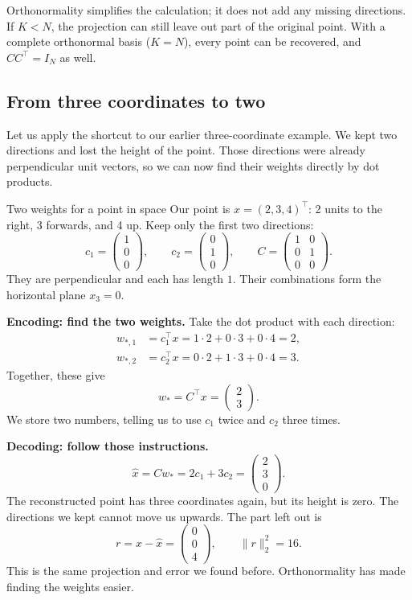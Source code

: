 \documentclass[a4paper,12pt,oneside]{report}
\begin{document}
Orthonormality simplifies the calculation; it does not add any
missing directions. If $K<N$, the projection can still leave out
part of the original point. With a complete orthonormal basis
($K=N$), every point can be recovered, and $CC^\top=I_N$ as well.

\subsection{From three coordinates to two}

Let us apply the shortcut to our earlier three-coordinate example.
We kept two directions and lost the height of the point. Those directions were already perpendicular unit vectors,
so we can now find their weights directly by dot products.

\begin{framedexample}{Two weights for a point in space}
Our point is $x=(2,3,4)^\top$: 2 units to the right, 3 forwards,
and 4 up. Keep only the first two directions:
\[
  c_1=\begin{pmatrix}1\\0\\0\end{pmatrix},\qquad
  c_2=\begin{pmatrix}0\\1\\0\end{pmatrix},\qquad
  C=\begin{pmatrix}1&0\\0&1\\0&0\end{pmatrix}.
\]
They are perpendicular and each has length $1$. Their combinations
form the horizontal plane $x_3=0$.

\textbf{Encoding: find the two weights.}
Take the dot product with each direction:
\[
\begin{aligned}
  w_{*,1}&=c_1^\top x=1\cdot2+0\cdot3+0\cdot4=2,\\
  w_{*,2}&=c_2^\top x=0\cdot2+1\cdot3+0\cdot4=3.
\end{aligned}
\]
Together, these give
\[
  w_*=C^\top x=\begin{pmatrix}2\\3\end{pmatrix}.
\]
We store two numbers, telling us to use $c_1$ twice and $c_2$ three times.

\textbf{Decoding: follow those instructions.}
\[
  \hat{x}=Cw_*=2c_1+3c_2=\begin{pmatrix}2\\3\\0\end{pmatrix}.
\]
The reconstructed point has three coordinates again, but its height
is zero. The directions we kept cannot move us upwards.
The part left out is
\[
  r=x-\hat{x}=\begin{pmatrix}0\\0\\4\end{pmatrix},
  \qquad \lVert r\rVert_2^2=16.
\]
This is the same projection and error we found before. Orthonormality
has made finding the weights easier.


\end{framedexample}
\end{document}
